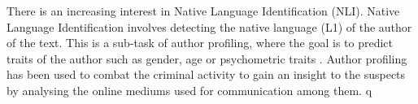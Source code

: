 There is an increasing interest in Native Language Identification (NLI).
Native Language Identification involves detecting the native language (L1) of the author of the text.
This is a sub-task of author profiling, where the goal is to predict traits of the author such as gender, age or psychometric traits \citep{estival2007author}.
Author profiling has been used to combat the criminal activity\citep{abbasi2005applying} to gain an insight to the suspects by analysing the online mediums used for communication among them.
 q 		